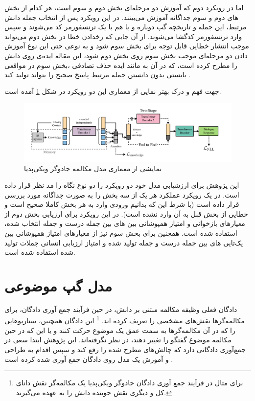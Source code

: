 اما در رویکرد دوم که آموزش دو مرحله‌ای بخش دوم و سوم است، هر کدام از بخش ‌های دوم و سوم جداگانه آموزش می‌بینند. در این رویکرد پس از انتخاب جمله دانش مرتبط، این جمله و تاریخچه گپ دوباره و با هم با یک ترنسفورمر کد می‌شوند و سپس وارد ترنسفورمر کدگشا می‌شوند. از آن جایی که رخدادن خطا در بخش دوم می‌تواند موجب انتشار خطایی قابل توجه برای بخش سوم شود و به نوعی حتی این نوع آموزش دادن دو مرحله‌ای موجب
 بخش سوم روی بخش دوم شود، این مقاله ایده‌ی 
 روی دانش را مطرح کرده است، که در آن به مانند ایده حذف تصادفی
،بخش سوم در مواقعی بایستی بدون دانستن جمله مرتبط   پاسخ صحیح را بتواند تولید کند
\cite{wizard}.

  جهت فهم و درک بهتر نمایی از معماری این دو رویکرد در شکل
\ref{fig:chap2:wizard-arch}
آمده است.

 \begin{figure}[H]
	\centering
	\includegraphics[width=1\textwidth]{images/chap2/wizard_arch.png}
	\caption[نمایشی از معماری مدل مکالمه جادوگر ویکی‌پدیا]
	{نمایشی از معماری مدل مکالمه جادوگر ویکی‌پدیا
		\cite{wizard}}	
	\label{fig:chap2:wizard-arch}
\end{figure}

این پژوهش برای ارزشیابی مدل خود دو رویکرد را دو نوع نگاه را مد نظر قرار داده است. در یک رویکرد عملکرد هر یک از سه بخش را به صورت جداگانه مورد بررسی قرار داده است (با شرط این که بدانیم ورودی وارد به هر بخش کاملا صحیح است و خطایی از بخش قبل به آن وارد نشده است). در این رویکرد برای ارزیابی بخش دوم از معیارهای بازخوانی و امتیاز 
همپوشانی
بین 
‌های بین جمله درست و جمله انتخاب شده، استفاده شده است. همچنین برای بخش سوم نیز از معیار‌های 
امتیاز 
همپوشانی
بین 
یک‌تایی
‌های بین جمله درست و جمله تولید شده
و امتیاز ارزیابی انسانی جملات تولید شده استفاده شده است.


\section{مدل گپ موضوعی}

دادگان فعلی وظیفه مکالمه مبتنی بر دانش،‌ در حین فرآیند جمع آوری دادگان،‌ برای مکالمه‌گرها نقش‌های مشخصی را تعریف کرده اند.
\footnote{برای مثال در فرآیند جمع آوری دادگان جادوگر ویکی‌پدیا یک مکالمه‌گر نقش دانای کل و دیگری نقش جوینده دانش را به عهده می‌گیرند.}
 این دادگان همچنین، سناریو‌هایی را که در آن مکالمه‌گرها به سمت عمق یک  موضوع حرکت کنند و یا این که در حین مکالمه موضوع گفتگو را تغییر دهند، در نظر نگرفته‌اند. این پژوهش ابتدا سعی در جمع‌آوری دادگانی دارد که چالش‌های مطرح شده را رفع کند و سپس اقدام به طراحی و آموزش یک مدل روی دادگان جمع آوری شده کرده است
 \cite{Topical_Chat}.

